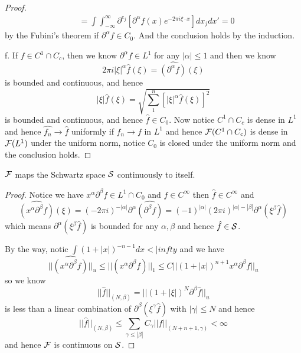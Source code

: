 \begin{proof}
\[\begin{aligned}
    &= \int\int_{-\infty}^{\infty} \partial^{e_j}[\partial^{\alpha}f(x)e^{-2\pi i \xi \cdot x}]dx_j dx' = 0
    \end{aligned}
    \]
    by the Fubini's theorem if $\partial^{\alpha}f \in C_0$. And the conclusion holds by the induction.\par
    f. If $f\in C^1\cap C_c$, then we know $\partial^{\alpha} f \in L^1$ for any $|\alpha|\leq 1$ and then we know
    \[
    2\pi i|\xi|^{\alpha}\hat{f}(\xi) = \hat{(\partial^{\alpha} f)}(\xi)
    \]
    is bounded and continuous, and hence
    \[
    |\xi|\hat{f}(\xi) = \sqrt{\sum_1^n [|\xi|^{\alpha}\hat{f}(\xi)]^2}
    \]
    is bounded and continuous, and hence $\hat{f} \in C_0$. Now notice $C^1\cap C_c$ is dense in $L^1$ and hence $\hat{f_n} \to \hat{f}$ uniformly if $f_n \to f$ in $L^1$ and hence $\mathcal{F}(C^1\cap C_c)$ is dense in $\mathcal{F}(L^1)$ under the uniform norm, notice $C_0$ is closed under the uniform norm and the conclusion holds.
\end{proof}

\begin{corollary}
    $\mathcal{F}$ maps the Schwartz space $\mathcal{S}$ continuously to itself.
\end{corollary}
\begin{proof}\par
    Notice we have $x^{\alpha}\partial^{\beta} f\in L^1\cap C_0$ and $f\in C^{\infty}$ then $\hat{f}\in C^{\infty}$ and
    \[
    \hat{(x^{\alpha}\partial^{\beta}f)}(\xi) = (-2\pi i)^{-|\alpha|}\partial^{\alpha}\hat{(\partial^{\beta}f)} = (-1)^{|\alpha|}(2\pi i)^{|\alpha|-|\beta|}\partial^{\alpha}(\xi^{\beta}\hat{f})
    \]
    which means $\partial^{\alpha}(\xi^{\beta}\hat{f})$ is bounded for any $\alpha,\beta$ and hence $\hat{f} \in \mathcal{S}$.\par
    By the way, notic $\int (1+|x|)^{-n-1}dx<|infty$ and we have
    \[
    ||\hat{(x^{\alpha}\partial^{\beta}f)}||_u \leq ||(x^{\alpha}\partial^{\beta}f)||_1 \leq C||(1+|x|)^{n+1}x^{\alpha}\partial^{\beta}f||_u
    \]
    so we know
    \[
    ||\hat{f}||_{(N,\beta)} = ||(1+|\xi|)^N\partial^{\beta}\hat{f}||_u
    \]
    is less than a linear combination of $\partial^{\beta}(\xi^{\gamma}\hat{f})$ with $|\gamma| \leq N$ and hence
    \[
    ||\hat{f}||_{(N,\beta)} \leq \sum_{\gamma \leq |\beta|} C_{\gamma}||f||_{(N+n+1,\gamma)} < \infty 
    \]
    and hence $\mathcal{F}$ is continuous on $\mathcal{S}$.
\end{proof}

